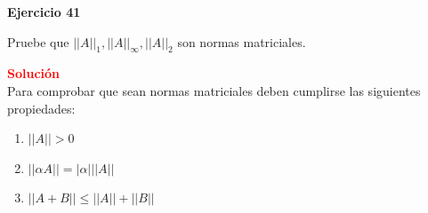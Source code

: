 \documentclass[12pt]{article}
\begin{document}

\noindent \textbf{Ejercicio 41}

Pruebe que $||A||_{1}, ||A||_{\infty}, ||A||_{2}$ son normas matriciales.

\noindent \textcolor{red}{\bf Solución}\\
Para comprobar que sean normas matriciales deben cumplirse las siguientes propiedades:
\begin{enumerate}
    \item $||A||>0$
    \item $|| \alpha A||=| \alpha|||A||$
    \item $||A+B||\leq ||A||+||B||$
\end{enumerate}
\end{document}
